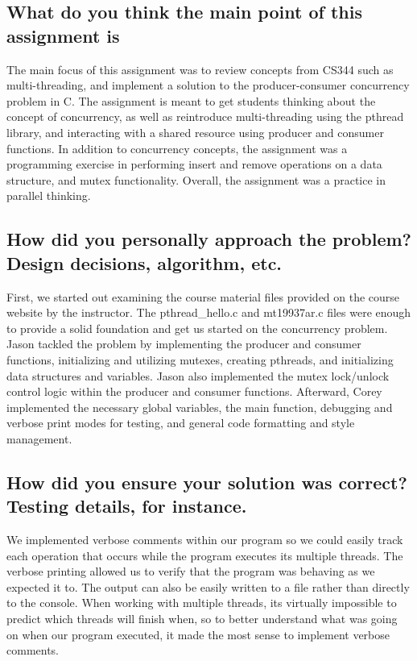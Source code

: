 \documentclass[onecolumn, draftclsnofoot,10pt, compsoc]{IEEEtran}
\begin{document}
\subsection{What do you think the main point of this assignment is}

\noindent 
The main focus of this assignment was to review concepts from CS344 such as multi-threading, and implement a solution to the producer-consumer concurrency problem in C. The assignment is meant to get students thinking about the concept of concurrency, as well as reintroduce multi-threading using the pthread library, and interacting with a shared resource using producer and consumer functions. In addition to concurrency concepts, the assignment was a programming exercise in performing insert and remove operations on a data structure, and mutex functionality. Overall, the assignment was a practice in parallel thinking. 
\\

\subsection{How did you personally approach the problem? Design decisions, algorithm, etc.}

\noindent 
First, we started out examining the course material files provided on the course website by the instructor. The pthread\_hello.c and mt19937ar.c files were enough to provide a solid foundation and get us started on the concurrency problem. Jason tackled the problem by implementing the producer and consumer functions, initializing and utilizing mutexes, creating pthreads, and initializing data structures and variables. Jason also implemented the mutex lock/unlock control logic within the producer and consumer functions. Afterward, Corey implemented the necessary global variables, the main function, debugging and verbose print modes for testing, and general code formatting and style management.
\\


\subsection{How did you ensure your solution was correct? Testing details, for instance.}
\noindent 
We implemented verbose comments within our program so we could easily track each operation that occurs while the program executes its multiple threads. The verbose printing allowed us to verify that the program was behaving as we expected it to. The output can also be easily written to a file rather than directly to the console. When working with multiple threads, its virtually impossible to predict which threads will finish when, so to better understand what was going on when our program executed, it made the most sense to implement verbose comments.
\\
\end{document}
